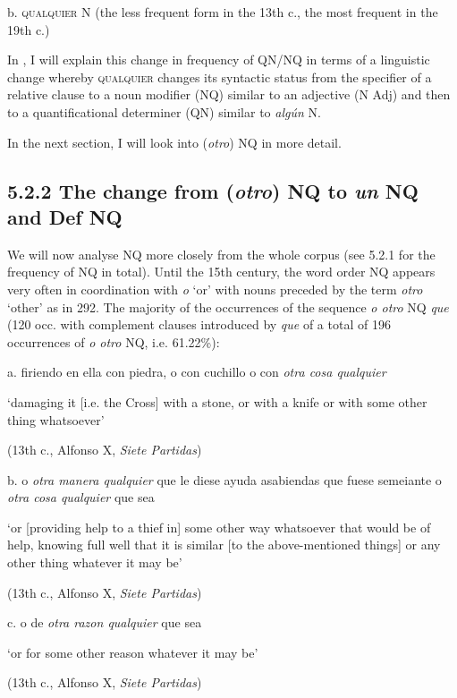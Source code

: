   b.  \textsc{qualquier} N (the less frequent form in the 13th c., the most frequent in the 19th c.)

In , I will explain this change in frequency of QN/NQ in terms of a linguistic change whereby \textsc{qualquier} changes its syntactic status from the specifier of a relative clause to a noun modifier (NQ) similar to an adjective (N Adj) and then to a quantificational determiner (QN) similar to \textit{algún} N.

  In the next section, I will look into (\textit{otro}) NQ in more detail. 

\subsection{\textbf{5.2.2} \textbf{The} \textbf{change} \textbf{from} \textbf{(\textit{otro}}\textbf{) }\textbf{NQ} \textbf{to} \textbf{\textit{un} }\textbf{NQ }\textbf{and} \textbf{Def} \textbf{NQ}}

We will now analyse NQ more closely from the whole corpus (see 5.2.1 for the frequency of NQ in total). Until the 15th century, the word order NQ appears very often in coordination with \textit{o} ‘or’ with nouns preceded by the term \textit{otro} ‘other’ as in 292. The majority of the occurrences of the sequence \textit{o otro} NQ \textit{que} (120 occ. with complement clauses introduced by \textit{que} of a total of 196 occurrences of \textit{o otro} NQ, i.e. 61.22\%):

  a.  firiendo en ella con piedra, o con cuchillo o con \textit{otra cosa qualquier} 

    ‘damaging it [i.e. the Cross] with a stone, or with a knife or with some other thing whatsoever’

    (13th c., Alfonso X, \textit{Siete Partidas})

  b.  o \textit{otra manera qualquier} que le diese ayuda asabiendas que fuese semeiante o \textit{otra cosa qualquier} que sea 

    ‘or [providing help to a thief in] some other way whatsoever that would be of help, knowing full well that it is similar [to the above-mentioned things] or any other thing whatever it may be’

    (13th c., Alfonso X, \textit{Siete Partidas})

  c.  o de \textit{otra razon qualquier} que sea 

    ‘or for some other reason whatever it may be’

    (13th c., Alfonso X, \textit{Siete Partidas})

